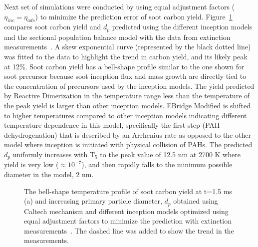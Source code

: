 Next set of simulations were conducted by using equal adjustment factors ($\eta_{inc}=\eta_{ads}$) to minimize the prediction error of soot carbon yield. Figure~\ref{fig:shockagof_yield_dp_cpr} compares soot carbon yield and $d_p$ predicted using the different inception models and the sectional population balance model with the data from extinction measurements~\citep{agafonov2016unified}. A skew exponential curve (represented by the black dotted line) was fitted to the data to highlight the trend in carbon yield, and its likely peak at 12\%. Soot carbon yield has a bell-shape profile similar to the one shown for soot precursor because soot inception flux and mass growth are directly tied to the concentration of precursors used by the inception models. The yield predicted by Reactive Dimerization in the temperature range less than the temperature of the peak yield is larger than other inception models. EBridge Modified is shifted to higher temperatures compared to other inception models indicating different temperature dependence in this model, specifically the first step (PAH dehydrogenation) that is described by an Arrhenius rate as opposed to the other model where inception is initiated with physical collision of PAHs. The predicted $d_p$ uniformly increases with $\mathrm{T_5}$ to the peak value of 12.5 nm at 2700 K where yield is very low ($\approx10^{-7}$), and then rapidly falls to the minimum possible diameter in the model, 2 nm.

\begin{figure}[H]
	\centering
	\caption{The bell-shape temperature profile of soot carbon yield at t=1.5 ms (a) and increasing primary particle diameter, $d_p$ obtained using Caltech mechanism and different inception models optimized using equal adjustment factors to minimize the prediction with extinction measurements~\citep{agafonov2016unified}. The dashed line was added to show the trend in the measurements.}
	\label{fig:shockagof_yield_dp_cpr} 
\end{figure}


